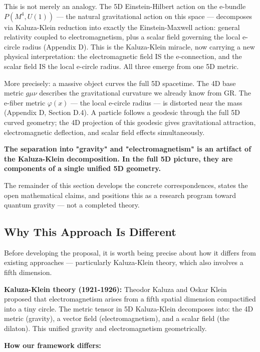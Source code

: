 \documentclass[aps,prd,preprint,superscriptaddress,longbibliography,floatfix]{revtex4-2}
\theoremstyle{remark}
\begin{document}
This is not merely an analogy. The 5D Einstein-Hilbert action on the e-bundle $P(M^{4}, U(1))$ --- the natural gravitational action on this space --- decomposes via Kaluza-Klein reduction into exactly the Einstein-Maxwell action: general relativity coupled to electromagnetism, plus a scalar field governing the local e-circle radius (Appendix D). This is the Kaluza-Klein miracle, now carrying a new physical interpretation: the electromagnetic field IS the e-connection, and the scalar field IS the local e-circle radius. All three emerge from one 5D metric.

More precisely: a massive object curves the full 5D spacetime. The 4D base metric $g\mu\nu$ describes the gravitational curvature we already know from GR. The e-fiber metric $\varphi(x)$ --- the local e-circle radius --- is distorted near the mass (Appendix D, Section D.4). A particle follows a geodesic through the full 5D curved geometry; the 4D projection of this geodesic gives gravitational attraction, electromagnetic deflection, and scalar field effects simultaneously.

\textbf{The separation into "gravity" and "electromagnetism" is an artifact of the Kaluza-Klein decomposition. In the full 5D picture, they are components of a single unified 5D geometry.}

The remainder of this section develops the concrete correspondences, states the open mathematical claims, and positions this as a research program toward quantum gravity --- not a completed theory.



\subsection{Why This Approach Is Different}

Before developing the proposal, it is worth being precise about how it differs from existing approaches --- particularly Kaluza-Klein theory, which also involves a fifth dimension.

\textbf{Kaluza-Klein theory (1921-1926):} Theodor Kaluza and Oskar Klein proposed that electromagnetism arises from a fifth spatial dimension compactified into a tiny circle. The metric tensor in 5D Kaluza-Klein decomposes into: the 4D metric (gravity), a vector field (electromagnetism), and a scalar field (the dilaton). This unified gravity and electromagnetism geometrically.

\textbf{How our framework differs:}
\end{document}
